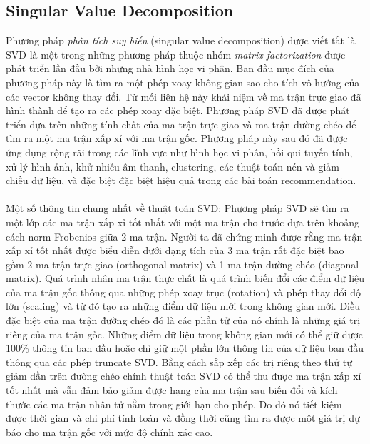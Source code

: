\subsection{Singular Value Decomposition}
Phương pháp \textit{phân tích suy biến} (singular value decomposition) được viết tắt là SVD là một trong những phương pháp thuộc nhóm \textit{matrix factorization} được phát triển lần đầu bởi những nhà hình học vi phân. Ban đầu mục đích của phương pháp này là tìm ra một phép xoay không gian sao cho tích vô hướng của các vector không thay đổi. Từ mối liên hệ này khái niệm về ma trận trực giao đã hình thành để tạo ra các phép xoay đặc biệt. Phương pháp SVD đã được phát triển dựa trên những tính chất của ma trận trực giao và ma trận đường chéo để tìm ra một ma trận xấp xỉ với ma trận gốc. Phương pháp này sau đó đã được ứng dụng rộng rãi trong các lĩnh vực như hình học vi phân, hồi qui tuyến tính, xử lý hình ảnh, khử nhiễu âm thanh, clustering, các thuật toán nén và giảm chiều dữ liệu, và đặc biệt đặc biệt hiệu quả trong các bài toán recommendation.\\
\\
Một số thông tin chung nhất về thuật toán SVD: Phương pháp SVD sẽ tìm ra một lớp các ma trận xấp xỉ tốt nhất với một ma trận cho trước dựa trên khoảng cách norm Frobenios giữa 2 ma trận. Người ta đã chứng minh được rằng ma trận xấp xỉ tốt nhất được biểu diễn dưới dạng tích của 3 ma trận rất đặc biệt bao gồm 2 ma trận trực giao (orthogonal matrix) và 1 ma trận đường chéo (diagonal matrix). Quá trình nhân ma trận thực chất là quá trình biến đổi các điểm dữ liệu của ma trận gốc thông qua những phép xoay trục (rotation) và phép thay đổi độ lớn (scaling) và từ đó tạo ra những điểm dữ liệu mới trong không gian mới. Điều đặc biệt của ma trận đường chéo đó là các phần tử của nó chính là những giá trị riêng của ma trận gốc. Những điểm dữ liệu trong không gian mới có thể giữ được 100\% thông tin ban đầu hoặc chỉ giữ một phần lớn thông tin của dữ liệu ban đầu thông qua các phép truncate SVD. Bằng cách sắp xếp các trị riêng theo thứ tự giảm dần trên đường chéo chính thuật toán SVD có thể thu được ma trận xấp xỉ tốt nhất mà vẫn đảm bảo giảm được hạng của ma trận sau biến đổi và kích thước các ma trận nhân tử nằm trong giới hạn cho phép. Do đó nó tiết kiệm được thời gian và chi phí tính toán và đồng thời cũng tìm ra được một giá trị dự báo cho ma trận gốc với mức độ chính xác cao.
